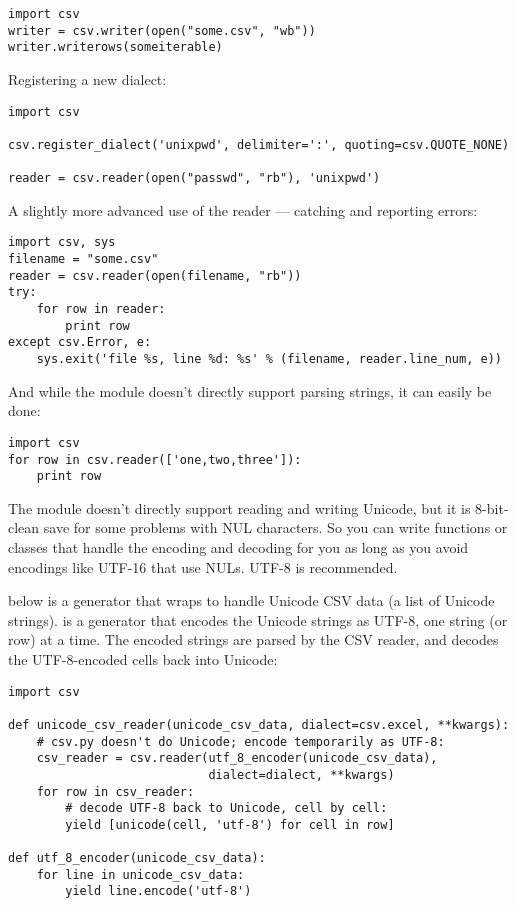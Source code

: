 \begin{verbatim}
import csv
writer = csv.writer(open("some.csv", "wb"))
writer.writerows(someiterable)
\end{verbatim}

Registering a new dialect:

\begin{verbatim}
import csv

csv.register_dialect('unixpwd', delimiter=':', quoting=csv.QUOTE_NONE)

reader = csv.reader(open("passwd", "rb"), 'unixpwd')
\end{verbatim}

A slightly more advanced use of the reader --- catching and reporting errors:

\begin{verbatim}
import csv, sys
filename = "some.csv"
reader = csv.reader(open(filename, "rb"))
try:
    for row in reader:
        print row
except csv.Error, e:
    sys.exit('file %s, line %d: %s' % (filename, reader.line_num, e))
\end{verbatim}

And while the module doesn't directly support parsing strings, it can
easily be done:

\begin{verbatim}
import csv
for row in csv.reader(['one,two,three']):
    print row
\end{verbatim}

The  module doesn't directly support reading and writing
Unicode, but it is 8-bit-clean save for some problems with \ASCII{} NUL
characters.  So you can write functions or classes that handle the
encoding and decoding for you as long as you avoid encodings like
UTF-16 that use NULs.  UTF-8 is recommended.

 below is a generator that wraps
 to handle Unicode CSV data (a list of Unicode
strings).   is a generator that encodes the
Unicode strings as UTF-8, one string (or row) at a time.  The encoded
strings are parsed by the CSV reader, and
 decodes the UTF-8-encoded cells back
into Unicode:

\begin{verbatim}
import csv

def unicode_csv_reader(unicode_csv_data, dialect=csv.excel, **kwargs):
    # csv.py doesn't do Unicode; encode temporarily as UTF-8:
    csv_reader = csv.reader(utf_8_encoder(unicode_csv_data),
                            dialect=dialect, **kwargs)
    for row in csv_reader:
        # decode UTF-8 back to Unicode, cell by cell:
        yield [unicode(cell, 'utf-8') for cell in row]

def utf_8_encoder(unicode_csv_data):
    for line in unicode_csv_data:
        yield line.encode('utf-8')
\end{verbatim}

